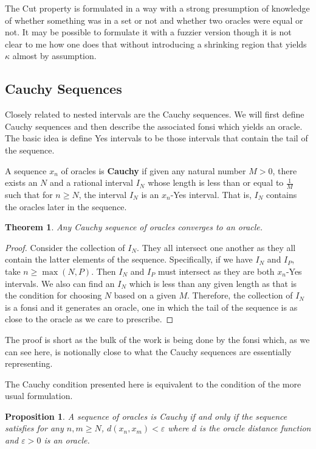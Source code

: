 \documentclass[12pt]{article}
\newtheorem{theorem}{Theorem}[subsection]
\newtheorem{proposition}{Proposition}[subsection]
\begin{document}
The Cut property is formulated in a way with a strong presumption of knowledge of whether something was in a set or not and whether two oracles were equal or not. It may be possible to formulate it with a fuzzier version though it is not clear to me how one does that without introducing a shrinking region that yields $\kappa$ almost by assumption. 


\subsection{Cauchy Sequences}\label{sec:cauchy}

Closely related to nested intervals are the Cauchy sequences. We will first define Cauchy sequences and then describe the associated fonsi which yields an oracle. The basic idea is define Yes intervals to be those intervals that contain the tail of the sequence. 

A sequence $x_n$ of oracles is \textbf{Cauchy} if given any natural number $M > 0$, there exists an $N$ and a rational interval $I_N$ whose length is less than or equal to $\frac{1}{M}$ such that for $n \geq N$, the interval $I_N$ is an $x_n$-Yes interval. That is, $I_N$ contains the oracles later in the sequence. 

\begin{theorem}\label{th:cauchy}
Any Cauchy sequence of oracles converges to an oracle. 
\end{theorem}

\begin{proof}
    Consider the collection of $I_N$. They all intersect one another as they all contain the latter elements of the sequence. Specifically, if we have $I_N$ and $I_P$, take $n \geq \max(N, P)$. Then $I_N$ and $I_P$ must intersect as they are both $x_n$-Yes intervals. We also can find an $I_N$ which is less than any given length as that is the condition for choosing $N$ based on a given $M$. Therefore, the collection of $I_N$ is a fonsi and it generates an oracle, one in which the tail of the sequence is as close to the oracle as we care to prescribe.     
\end{proof}

The proof is short as the bulk of the work is being done by the fonsi which, as we can see here, is notionally close to what the Cauchy sequences are essentially representing. 

The Cauchy condition presented here is equivalent to the condition of the more usual formulation.

\begin{proposition}
    A sequence of oracles is Cauchy if and only if the sequence satisfies for any $n, m \geq N$, $d(x_n,  x_m) < \varepsilon$ where $d$ is the oracle distance function and $\varepsilon > 0$ is an oracle. 
\end{proposition} 
\end{document}
